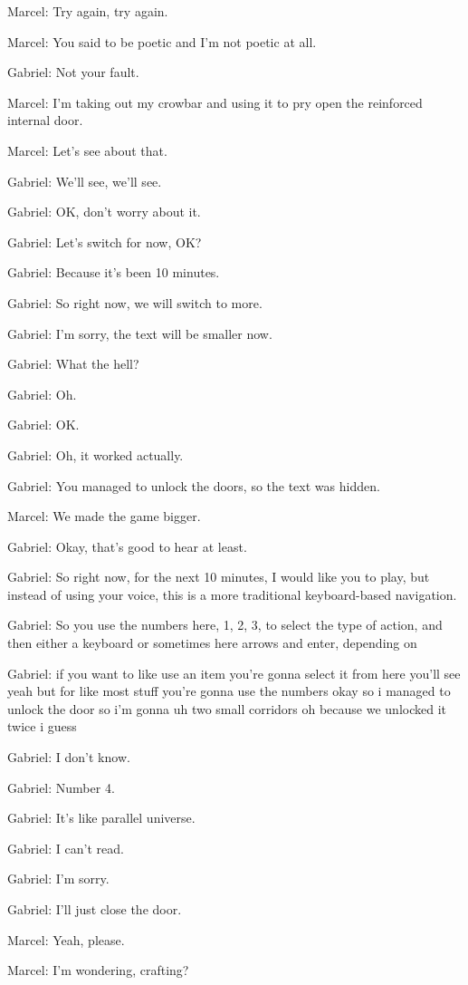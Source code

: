 Marcel: Try again, try again.

Marcel: You said to be poetic and I'm not poetic at all.

Gabriel: Not your fault.

Marcel: I'm taking out my crowbar and using it to pry open the reinforced internal door.

Marcel: Let's see about that.

Gabriel: We'll see, we'll see.

Gabriel: OK, don't worry about it.

Gabriel: Let's switch for now, OK?

Gabriel: Because it's been 10 minutes.

Gabriel: So right now, we will switch to more.

Gabriel: I'm sorry, the text will be smaller now.

Gabriel: What the hell?

Gabriel: Oh.

Gabriel: OK.

Gabriel: Oh, it worked actually.

Gabriel: You managed to unlock the doors, so the text was hidden.

Marcel: We made the game bigger.

Gabriel: Okay, that's good to hear at least.

Gabriel: So right now, for the next 10 minutes, I would like you to play, but instead of using your voice, this is a more traditional keyboard-based navigation.

Gabriel: So you use the numbers here, 1, 2, 3, to select the type of action, and then either a keyboard or sometimes here arrows and enter, depending on

Gabriel: if you want to like use an item you're gonna select it from here you'll see yeah but for like most stuff you're gonna use the numbers okay so i managed to unlock the door so i'm gonna uh two small corridors oh because we unlocked it twice i guess

Gabriel: I don't know.

Gabriel: Number 4.

Gabriel: It's like parallel universe.

Gabriel: I can't read.

Gabriel: I'm sorry.

Gabriel: I'll just close the door.

Marcel: Yeah, please.

Marcel: I'm wondering, crafting?

